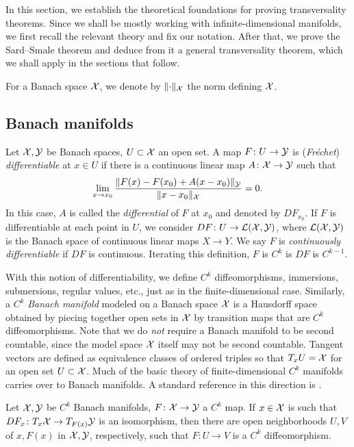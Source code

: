 In this section, we establish the theoretical foundations for proving 
transversality theorems. 
Since we shall be mostly working with infinite-dimensional manifolds, 
we first recall the relevant theory and fix our notation. 
After that, we prove the Sard--Smale theorem and deduce from it 
a general transversality theorem, which we shall apply 
in the sections that follow.

For a Banach space ${\mathcal{X}}$, we denote by 
$\mathclose{\|} \cdot \mathclose{\|} _{\mathcal{X}}$ the norm defining ${\mathcal{X}}$.

\subsection{Banach manifolds}
Let ${\mathcal{X}}, {\mathcal{Y}}$ be Banach spaces, $U \subset {\mathcal{X}}$ an open set. 
A map $F \colon U \to {\mathcal{Y}}$ is (\textit{Fr{\'e}chet}) \textit{differentiable} 
at $x \in U$ if there is a continuous linear map $A \colon {\mathcal{X}} \to {\mathcal{Y}}$ 
such that
\[
    \lim_{x \to x_0} \frac {\| F(x) - F(x_0) + A(x - x_0) \|_{\mathcal{Y}}} {\| x - x_0 \|_{\mathcal{X}}}
        = 0.
\]
In this case, $A$ is called the \textit{differential} of $F$ at $x_0$ 
and denoted by $DF_{x_0}$. 
If $F$ is differentiable at each point in $U$, we consider 
$DF \colon U \to {\mathcal{L}} ({\mathcal{X}}, {\mathcal{Y}})$, where ${\mathcal{L}} ({\mathcal{X}}, {\mathcal{Y}})$ is 
the Banach space of continuous linear maps $X \to Y$. 
We say $F$ is \textit{continuously differentiable} if $DF$ is continuous. 
Iterating this definition, $F$ is $C^k$ is $DF$ is $C^{k-1}$.

With this notion of differentiability, we define $C^k$ diffeomorphisms, 
immersions, submersions, regular values, etc., just as 
in the finite-dimensional case. 
Similarly, a $C^k$ \textit{Banach manifold} modeled 
on a Banach space ${\mathcal{X}}$ is a Hausdorff space obtained by piecing together 
open sets in ${\mathcal{X}}$ by transition maps that are $C^k$ diffeomorphisms. 
Note that we do \textit{not} require a Banach manifold to be 
second countable, since the model space ${\mathcal{X}}$ itself 
may not be second countable. 
Tangent vectors are defined as equivalence classes of ordered triples 
so that $T_x U = {\mathcal{X}}$ for an open set $U \subset {\mathcal{X}}$. 
Much of the basic theory of finite-dimensional $C^k$ manifolds 
carries over to Banach manifolds. 
A standard reference in this direction is \cite{Lan}.

\begin{theorem}
    Let ${\mathcal{X}}, {\mathcal{Y}}$ be $C^k$ Banach manifolds, 
    $F \colon {\mathcal{X}} \to {\mathcal{Y}}$ a $C^k$ map. 
    If $x \in {\mathcal{X}}$ is such that $DF_x \colon T_x {\mathcal{X}} \to T_{F(x)} {\mathcal{Y}}$ 
    is an isomorphism, then there are open neighborhoods $U, V$ 
	of $x, F(x)$ in ${\mathcal{X}}, {\mathcal{Y}}$, respectively, such that 
	$F \colon U \to V$ is a $C^k$ diffeomorphism.
\end{theorem}

